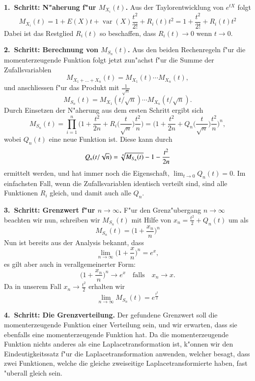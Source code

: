 {\parindent0pt\bf 1.~Schritt: N"aherung f"ur $M_{X_i}(t)$.} 
Aus der Taylorentwicklung von $e^{tX}$ folgt
\[
M_{X_i}(t)=1+E(X)t+\operatorname{var}(X)\frac{t^2}{2!}+R_i(t)t^2
=1+\frac{t^2}{2!}+R_i(t)t^2
\]
Dabei ist das Restglied $R_i(t)$ so beschaffen, dass
$R_i(t)\to 0$ wenn $t\to 0$.

\medskip
{\parindent0pt\bf 2.~Schritt: Berechnung von $M_{S_n}(t)$.}
Aus den beiden Rechenregeln f"ur die momenterzeugende Funktion folgt
jetzt zun"achst f"ur die Summe der Zufallsvariablen
\[
M_{X_1+\dots+X_n}(t)=M_{X_1}(t)\dotsm M_{X_n}(t),
\]
und anschliessen f"ur das Produkt mit $\frac1{\sqrt{n}}$
\[
M_{S_n}(t)=M_{X_1}(t/\sqrt{n})\dotsm M_{X_n}(t/\sqrt{n}).
\]
Durch Einsetzen der N"aherung aus dem ersten Schritt ergibt sich
\[
M_{S_n}(t)
=\prod_{i=1}^n\biggl(1+\frac{t^2}{2n}+R_i\biggl(\frac{t}{\sqrt{n}}\biggl)\frac{t^2}{n}\biggr)
=\biggl(1+\frac{t^2}{2n}+Q_n\biggl(\frac{t}{\sqrt{n}}\biggr)\frac{t^2}{n}\biggr)^n,
\]
wobei $Q_n(t)$ eine neue Funktion ist.
Diese kann durch
\[
Q_n(t/\sqrt{n})=\root{n}\of{M_{S_n}(t)}-1-\frac{t^2}{2n}
\]
ermittelt werden, und hat immer noch die Eigenschaft,
$\lim_{t\to0}Q_n(t)=0$.
Im einfachsten Fall, wenn die Zufallsvariablen
identisch verteilt sind, sind alle Funktionen $R_i$ gleich, und damit
auch alle $Q_n$.

\medskip
{\parindent0pt\bf 3.~Schritt: Grenzwert f"ur $n\to\infty$.}
F"ur den Grenz"ubergang $n\to\infty$ beachten wir nun, schreiben wir
$M_{S_n}(t)$ mit Hilfe von
$x_n=\frac{t^2}2+Q_n(t)$
um als
\[
M_{S_n}(t)=\biggl(1+\frac{x_n}n\biggr)^n
\]
Nun ist bereits aus der Analysis bekannt, dass
\[
\lim_{n\to\infty}\biggl(1+\frac{x}{n}\biggr)^n=e^x,
\]
es gilt aber auch in verallgemeinerter Form:
\[
\biggl(1+\frac{x_n}{n}\biggr)^n\to e^x\quad\text{falls}\quad x_n\to x.
\]
Da in unserem Fall $x_n\to \frac{t^2}2$ erhalten wir
\[
\lim_{n\to\infty}M_{S_n}(t)=e^{\frac{t^2}{2}}
\]

\medskip
{\parindent0pt\bf 4.~Schritt: Die Grenzverteilung.}
Der gefundene Grenzwert soll die momenterzeugende Funktion einer
Verteilung sein, und wir erwarten, dass sie ebenfalls eine
momenterzeugende Funktion hat.
Da die momenterzeugende Funktion
nichts anderes als eine Laplacetransformation ist, k"onnen wir
den Eindeutigkeitssatz f"ur die Laplacetransformation anwenden,
welcher besagt, dass zwei Funktionen, welche die gleiche zweiseitige
Laplacetransformierte haben, fast "uberall gleich sein.

